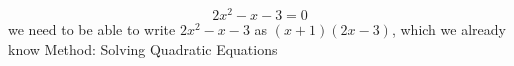     \begin{equation}
    2{x}^{2}-x-3=0\tag{9.18}
      \end{equation}
      \label{m39247*id149590}we need to be able to write $2{x}^{2}-x-3$ as $\left(x+1\right)\left(2x-3\right)$, which we already know
%             
%         
%       
% 
      \label{m39247*uid36}
          { Method: Solving Quadratic Equations}
            \nopagebreak
